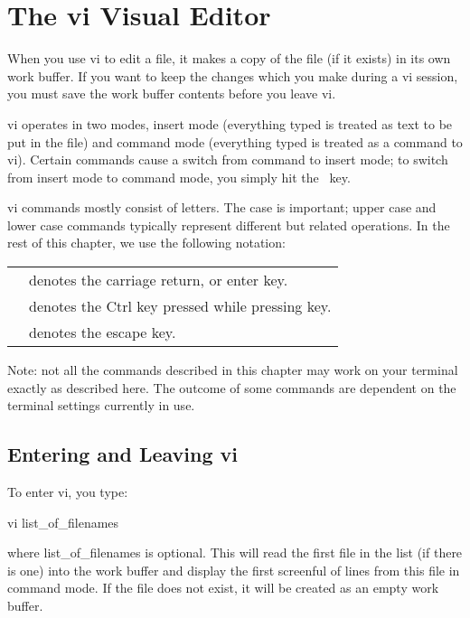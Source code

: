 \cleardoublepage
\chapter{The {\cmd vi} Visual Editor}
When you use {\cmd vi} to edit a file, it makes a copy of the file
(if it exists)  in its  own  work  buffer.  If you want to keep the
changes which  you make  during a  {\cmd vi} session,  you must  save
the work buffer contents before you leave {\cmd vi}.

   {\cmd vi} operates in two modes, {\kc insert mode\/} (everything
typed is treated as text to be  put in  the file)  and {\kc command 
mode\/} (everything  typed is treated as a command to  {\cmd vi}).
Certain  commands cause a switch from command to insert mode; to
switch from insert mode to command mode, you simply hit the \ESC\
key.

   {\cmd vi} commands  mostly consist  of letters.  The case is
important; upper case and lower case commands typically represent
different but related operations.  In the rest of this chapter, we
use the following notation:
\begin{display}
\begin{tabular}{@{}lp{}@{}}
\CR & denotes the carriage return, or enter key. \\
\CTRL{\ms key\/} & denotes the {\cd Ctrl} key pressed while pressing
{\ms key}.\\
\ESC & denotes the escape key.
\end{tabular}
\end{display}
\noindent
Note: not all the commands described in this chapter may work on your
terminal exactly as described here.  The outcome of some commands are 
dependent on the terminal settings currently in use.


\section{Entering and Leaving {\cmd vi}}
   To enter {\cmd vi}, you type:
\begin{display}\ms
{\cmd vi} list\_of\_filenames
\end{display}
\noindent
 where {\ms list\_of\_filenames\/} is optional.   This will  read the
first file in the list (if there is one)
into the work buffer and display the  first screenful  of lines  from
this  file in command mode.  If the file does not exist, it will be
created as an empty work buffer.

